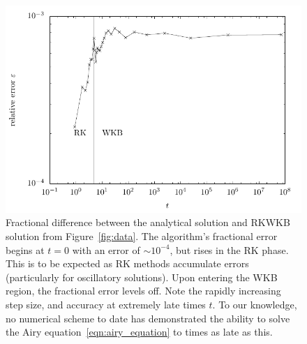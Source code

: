 \begin{figure}[tp]
  \centering
  \includegraphics[width=\textwidth]{chapters/RKWKB/figures/error}
  \caption{Fractional difference between the analytical solution and RKWKB solution from Figure~\protect\ref{fig:data}. The algorithm's fractional error begins at \(t=0\) with an error of \(\sim10^{-4}\), but rises in the RK phase. This is to be expected as RK methods accumulate errors (particularly for oscillatory solutions). Upon entering the WKB region, the fractional error levels off. Note the rapidly increasing step size, and accuracy at extremely late times \(t\). To our knowledge, no numerical scheme to date has demonstrated the ability to solve the Airy equation~\protect\eqref{eqn:airy_equation} to times as late as this.}\label{fig:error}
\end{figure}




